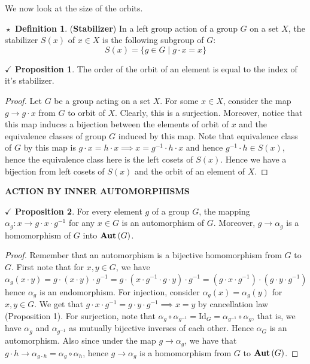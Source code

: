 \documentclass{article}
\theoremstyle{definition}
\newtheorem{definition}{$\boxed{\star}$ Definition}
\theoremstyle{remark}
\theoremstyle{definition}
\theoremstyle{definition}
\newtheorem{proposition}{$\checkmark$ Proposition}
\theoremstyle{definition}
\theoremstyle{proof}
\newcommand{\inv}[1]{#1^{-1}}
\newcommand{\Auto}[1]{\text{\textbf{Aut}}\left(#1\right)}
\begin{document}
We now look at the size of the orbits.
\begin{definition}
	(\textbf{Stabilizer}) In a left group action of a group $ G $ on a set $ X $, the stabilizer $ S(x) $ of $ x\in X $ is the following subgroup of $ G $:
	\[S(x) = \{g\in G\;\vert\; g\cdot x = x\}\]
\end{definition}
\newpage
\hrulefill
\begin{proposition}
	The order of the orbit of an element is equal to the index of it's stabilizer.
\end{proposition}
\begin{proof}
	Let $ G $ be a group acting on a set $ X $. For some $ x\in X $, consider the map $ g\to g\cdot x $ from $ G $ to orbit of $ X $. Clearly, this is a surjection. Moreover, notice that this map induces a bijection between the elements of orbit of $ x $ and the equivalence classes of group $ G $ induced by this map. Note that equivalence class of $ G $ by this map is $ g\cdot x = h\cdot x \implies x = \inv{g}\cdot h \cdot x $ and hence $ \inv{g}\cdot h \in S(x)  $, hence the equivalence class here is the left cosets of $ S(x) $. Hence we have a bijection from left cosets of $ S(x) $ and the orbit of an element of $ X $.
\end{proof}
\hrulefill
\textbf{ACTION BY INNER AUTOMORPHISMS}
\hrulefill
\begin{proposition}
	For every element $ g $ of a group $ G $, the mapping $ \alpha_g : x\to g\cdot x\cdot \inv{g} $ for any $ x\in G $ is an automorphism of $ G $. Moreover, $ g \to \alpha_g $ is a homomorphism of $ G $ into $ \Auto{G} $.
\end{proposition}
\begin{proof}
	Remember that an automorphism is a bijective homomorphism from $ G $ to $ G $. First note that for $ x,y \in G $, we have $ \alpha_g(x\cdot y) = g\cdot (x\cdot y)\cdot \inv{g} = g\cdot (x\cdot \inv{g}\cdot g\cdot y)\cdot \inv{g} = (g\cdot x\cdot \inv{g})\cdot (g\cdot y\cdot \inv{g})$ hence $ \alpha_g $ is an endomorphism. For injection, consider $ \alpha_g(x) = \alpha_g(y) $ for $ x,y\in G $. We get that $ g\cdot x\cdot \inv{g} = g\cdot y\cdot \inv{g} \implies x = y$ by cancellation law (Proposition 1). For surjection, note that $ \alpha_g \circ \alpha_{\inv{g}} = \text{Id}_G = \alpha_{\inv{g}}\circ \alpha_g$, that is, we have $ \alpha_g $ and $ \alpha_{\inv{g}} $ as mutually bijective inverses of each other. Hence $ \alpha_G $ is an automorphism. Also since under the map $ g\to \alpha_g $, we have that $ g\cdot h \to \alpha_{g\cdot h} =\alpha_g \circ \alpha_h $, hence $ g\to \alpha_g $ is a homomorphism from $ G $ to $ \Auto{G} $.
\end{proof}
\end{document}
